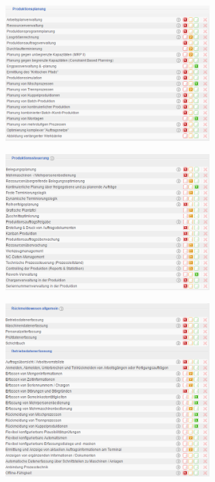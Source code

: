 \documentclass[12pt]{article}
\begin{document}
\begin{figure}[here!]
\centering
\includegraphics[width=0.7\textwidth]{images/tr21}
\end{figure}\FloatBarrier
\noindent
\begin{figure}[here!]
\centering
\includegraphics[width=0.7\textwidth]{images/tr22}
\end{figure}\FloatBarrier
\noindent
\begin{figure}[here!]
\centering
\includegraphics[width=0.7\textwidth]{images/tr23}
\end{figure}\FloatBarrier
\noindent
\end{document}
